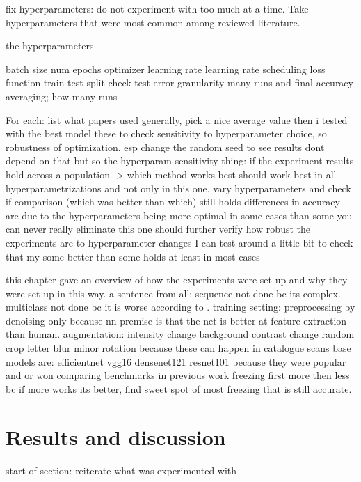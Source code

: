 \documentclass{article}
\begin{document}
fix hyperparameters: do not experiment with too much at a time.
Take hyperparameters that were most common among reviewed literature.

the hyperparameters

batch size 
num epochs 
optimizer 
learning rate 
learning rate scheduling
loss function
train test split
    check test error granularity
many runs and final accuracy averaging; how many runs

For each: list what papers used generally, pick a nice average value
then i tested with the best model these to check sensitivity to hyperparameter choice, so 
robustness of optimization. esp change the random seed to see results dont depend on that
    but so the hyperparam sensitivity thing:
        if the experiment results hold across a population -> which method works best should work best in all 
            hyperparametrizations and not only in this one. vary hyperparameters and check if comparison 
                (which was better than which) still holds
        differences in accuracy are due to the hyperparameters being more optimal in some cases than some 
            you can never really eliminate this 
            one should further verify how robust the experiments are to hyperparameter changes
            I can test around a little bit to check that my some better than some holds at least in most cases

this chapter gave an overview of how the experiments were set up and why they were set up in this way.
a sentence from all: sequence not done bc its complex. multiclass not done bc it is worse according to \cite{tibetan_ocr}.
training setting: preprocessing by denoising only because nn premise is that the net is better at feature extraction than human.
augmentation: intensity change background contrast change random crop letter blur minor rotation because these can happen in catalogue scans
base models are: efficientnet vgg16 densenet121 resnet101 because they were popular and or won comparing benchmarks in previous work
freezing first more then less bc if more works its better, find sweet spot of most freezing that is still accurate.

\section{Results and discussion}


start of section: reiterate what was experimented with
\end{document}
